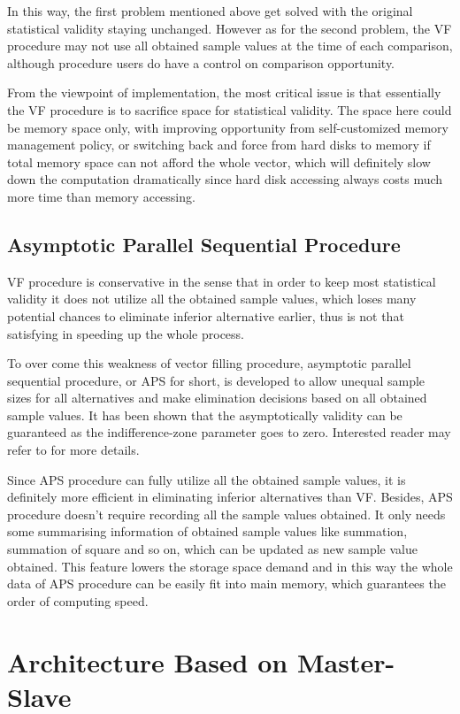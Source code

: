 \documentclass[12pt,a4]{report}
\begin{document}
In this way, the first problem mentioned above get solved with the original statistical validity staying unchanged. However as for the second problem, the VF procedure may not use all obtained sample values at the time of each comparison, although procedure users do have a control on comparison opportunity.

From the viewpoint of implementation, the most critical issue is that essentially the VF procedure is to sacrifice space for statistical validity. The space here could be memory space only, with improving opportunity from self-customized memory management policy, or switching back and force from hard disks to memory if total memory space can not afford the whole vector, which will definitely slow down the computation dramatically since hard disk accessing always costs much more time than memory accessing.

\subsection{Asymptotic Parallel Sequential Procedure}

VF procedure is conservative in the sense that in order to keep most statistical validity it does not utilize all the obtained sample values, which loses many potential chances to eliminate inferior alternative earlier, thus is not that satisfying in speeding up the whole process.

To over come this weakness of vector filling procedure, asymptotic parallel sequential procedure, or APS for short, is developed to allow unequal sample sizes for all alternatives and make elimination decisions based on all obtained sample values. It has been shown that the asymptotically validity can be guaranteed as the indifference-zone parameter goes to zero. Interested reader may refer to \cite{ras-seq-parallel} for more details.

Since APS procedure can fully utilize all the obtained sample values, it is definitely more efficient in eliminating inferior alternatives than VF. Besides, APS procedure doesn't require recording all the sample values obtained. It only needs some summarising information of obtained sample values like summation, summation of square and so on, which can be updated as new sample value obtained. This feature lowers the storage space demand and in this way the whole data of APS procedure can be easily fit into main memory, which guarantees the order of computing speed.

\section{Architecture Based on Master-Slave}
\end{document}

